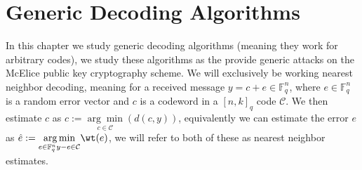 \chapter{Generic Decoding Algorithms}
In this chapter we study generic decoding algorithms (meaning they work for arbitrary codes), we study these algorithms as the provide generic attacks on the McElice public key cryptography scheme.
We will exclusively be working nearest neighbor decoding, meaning for a received message $y = c + e \in \mathbb{F}_q^{n}$, where $e \in \mathbb{F}_q^n$ is a random error vector and $c$ is a codeword in a $[n, k]_{q}$ code $\mathcal{C}$. We then estimate $c$ as $\hat{c} := \underset{c \in \mathcal{C}}{\arg \min} (d(c, y))$, equivalently we can estimate the error $e$ as $\hat{e} := \underset{e \in \mathbb{F}_q^n \\ y - e \in \mathcal{C}}{\arg \min} \wt(e)$, we will refer to both of these as nearest neighbor estimates.




